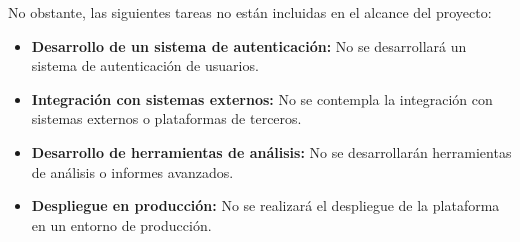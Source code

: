 No obstante, las siguientes tareas no están incluidas en el alcance del proyecto:
\begin{itemize}
    \item \textbf{Desarrollo de un sistema de autenticación:} No se desarrollará un sistema de autenticación de usuarios.
    \item \textbf{Integración con sistemas externos:} No se contempla la integración con sistemas externos o plataformas de terceros.
    \item \textbf{Desarrollo de herramientas de análisis:} No se desarrollarán herramientas de análisis o informes avanzados.
    \item \textbf{Despliegue en producción:} No se realizará el despliegue de la plataforma en un entorno de producción.
\end{itemize}